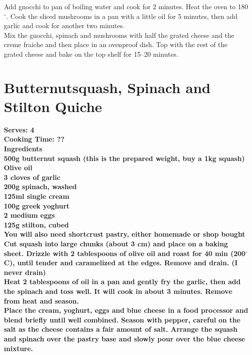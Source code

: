 \documentclass[18pt, oneside]{book}
\begin{document}
Add gnocchi to pan of boiling water and cook for 2 minutes. Heat the oven to 180$^{\circ}$. Cook the sliced mushrooms in a pan with a little oil for 5 minutes, then add garlic and cook for another two minutes. \\

Mix the gnocchi, spinach and mushrooms with half the grated cheese and the creme fraiche and then place in an ovenproof dish. Top with the rest of the grated cheese and bake on the top shelf for 15--20 minutes. 

\section{Butternutsquash, Spinach and Stilton Quiche}
\bf{Serves: 4} \\
\bf{Cooking Time: ??} \\

\bf{Ingredients} \normalfont \\
500g butternut squash (this is the prepared weight, buy a 1kg squash) \\
Olive oil \\
3 cloves of garlic \\
200g spinach, washed \\
125ml single cream \\
100g greek yoghurt \\
2 medium eggs \\
125g stilton, cubed \\
You will also need shortcrust pastry, either homemade or shop bought \\

Cut squash into large chunks (about 3 cm) and place on a baking sheet. Drizzle with 2 tablespoons of olive oil and roast for 40 min (200$^{\circ}$C), until tender and caramelized at the edges. Remove and drain. (I never drain) \\

Heat 2 tablespoons of oil in a pan and gently fry the garlic, then add the spinach and toss well. It will cook in about 3 minutes. Remove from heat and season. \\

Place the cream, yoghurt, eggs and blue cheese in a food processor and blend briefly until well combined. Season with pepper, careful on the salt as the cheese contains a fair amount of salt. Arrange the squash and spinach over the pastry base and slowly pour over the blue cheese mixture. \\
\end{document}

